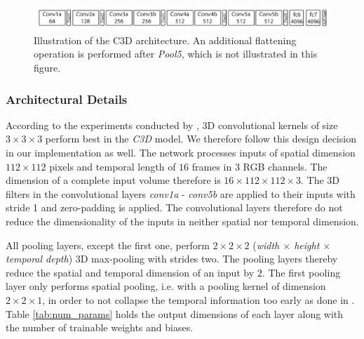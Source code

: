 \begin{figure}[H]
    \centering
    \includegraphics[width=\textwidth]{img_related/c3d_architecture}
    \caption{Illustration of the C3D architecture. An additional flattening operation is performed after \textit{Pool5}, which is not illustrated in this figure. \cite{tran_learning_2015}}
    \label{fig:c3d_architecture}
\end{figure}


\subsubsection{Architectural Details}
According to the experiments conducted by \textcite{tran_learning_2015}, 3D convolutional kernels of size $3 \times 3 \times 3$ perform best in the \textit{C3D} model.
We therefore follow this design decision in our implementation as well.
The network processes inputs of spatial dimension $112 \times 112$ pixels and temporal length of $16$ frames in $3$ RGB channels.
The dimension of a complete input volume therefore is $16 \times 112 \times 112 \times 3$.
The 3D filters in the convolutional layers \textit{conv1a} - \textit{conv5b} are applied to their inputs with stride 1 and zero-padding is applied.
The convolutional layers therefore do not reduce the dimensionality of the inputs in neither spatial nor temporal dimension.

All pooling layers, except the first one, perform $2 \times 2 \times 2$ (\textit{width $\times$ height $\times$ temporal depth}) 3D max-pooling with strides two.
The pooling layers thereby reduce the spatial and temporal dimension of an input by $2$.
The first pooling layer only performs spatial pooling, i.e. with a pooling kernel of dimension $2 \times 2 \times 1$, in order to not collapse the temporal information too early as done in \cite{tran_learning_2015}.
Table \ref{tab:num_params} holds the output dimensions of each layer along with the number of trainable weights and biases.

